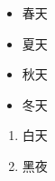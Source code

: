 \documentclass[a4paper,12pt]{ctexart}
\begin{document}
\begin{itemize}
  \item 春天
  \item 夏天
  \item 秋天
  \item 冬天
\end{itemize}

\begin{enumerate}[(1)]
  \item 白天
  \item 黑夜
\end{enumerate}
\end{document}
